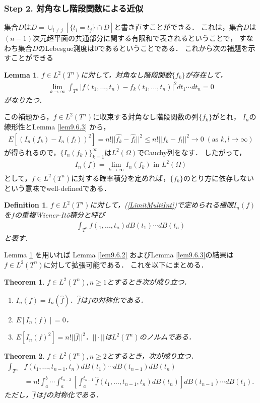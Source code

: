 \documentclass[a4paper,10pt]{jsarticle}
\theoremstyle{plain}
\newtheorem{theorem}{Theorem}
\newtheorem{definition}{Definition}
\newtheorem{lemma}{Lemma}
\newcommand{\eq}[1]{\begin{align}#1\end{align}}
\newcommand{\enums}[1]{\begin{enumerate}#1\end{enumerate}}
\begin{document}
\subsubsection*{Step 2. 対角なし階段関数による近似}
集合$D$は$D=\cup_{i\neq j}[\{t_i=t_j\}\cap D]$と書き直すことができる．
これは，集合$D$は$(n-1)$次元超平面の共通部分に関する有限和で表されるということで，
すなわち集合$D$のLebesgue測度は$0$であるということである．
これから次の補題を示すことができる
\begin{lemma}\label{lem9.6.4}
$f\in L^2(T^n)$に対して，対角なし階段関数$\{f_k\}$が存在して，
\eq{\lim_{k\rightarrow\infty}\int_{T^n}\left|f(t_1,...,t_n)-f_k(t_1,...,t_n)\right|^2dt_1\cdots dt_n=0}
がなりたつ．
\end{lemma}
この補題から，$f\in L^2(T^n)$に収束する対角なし階段関数の列$\{f_k\}$がとれ，
$I_n$の線形性とLemma \ref{lem9.6.3} から，
\eq{E\left[\left(I_n(f_k)-I_n(f_l)\right)^2\right]=n!||\hat{f_k}-\hat{f_l}||^2\le n!||f_k-f_l||^2\rightarrow0\;(\text{as }k,l\rightarrow\infty)}
が得られるので，$\{I_n(f_k)\}_{k=1}^\infty$は$L^2(\Omega)$でCauchy列をなす．
したがって，
\eq{I_n(f)=\lim_{k\rightarrow\infty}I_n(f_k)\text{ in }L^2(\Omega)\label{LimitMultiInt}}
として，$f\in L^2(T^n)$に対する確率積分を定めれば，$\{f_k\}$のとり方に依存しないという意味でwell-definedである．
\begin{definition}\label{def9.6.5}
$f\in L^2(T^n)$に対して，(\ref{LimitMultiInt})で定められる極限$I_n(f)$を$f$の重複Wiener-It\^o積分と呼び
\eq{\int_{T^n}f(_1,...,t_n)dB(t_1)\cdots dB(t_n)}
と表す．
\end{definition}
Lemma \ref{lem9.6.4} を用いれば Lemma \ref{lem9.6.2} およびLemma \ref{lem9.6.3}の結果は$f\in L^2(T^n)$に対して拡張可能である．
これを以下にまとめる．
\begin{theorem}\label{9.6.6}
$f\in L^2(T^n),n\ge1$とするとき次が成り立つ．
\enums{
	\item $I_n(f)=I_n(\hat{f})$．$\hat{f}$は$f$の対称化である．
	\item $E\left[I_n(f)\right]=0$．
	\item $E\left[I_n(f)^2\right]=n!||\hat{f}||^2$．$||\cdot||$は$L^2(T^n)$のノルムである．}
\end{theorem}

\begin{theorem}\label{thm9.6.7}
$f\in L^2(T^n), n\ge2$とするとき，次が成り立つ．
\eq{\int_{T^n}&f(t_1,...,t_{n-1},t_n)dB(t_1)\cdots dB(t_{n-1})dB(t_n)\\
	&=n!\int_a^b\cdots\int_a^{t_{n-2}}\left[\int_a^{t_{n-1}}\hat{f}(t_1,...,t_{n-1},t_n)dB(t_n)\right]dB(t_{n-1})\cdots dB(t_1).}
ただし，$\hat{f}$は$f$の対称化である．
\end{theorem}
\end{document}
